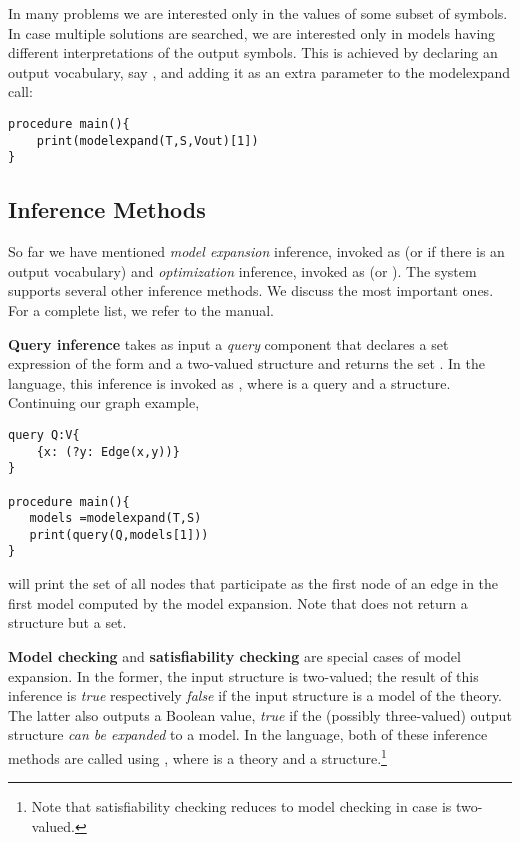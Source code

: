 In many problems we are interested only in the values of some subset of symbols. In case multiple solutions are searched, we are interested only in  models having different interpretations of the output symbols. This is achieved by declaring an output vocabulary, say , and adding it as an extra parameter to the  modelexpand call: 
\begin{lstlisting}
procedure main(){
    print(modelexpand(T,S,Vout)[1])
}
\end{lstlisting}

\subsection{Inference Methods}

So far we have mentioned \emph{model expansion} inference, invoked as
 (or  if there is an output vocabulary) and \emph{optimization} inference, invoked as
 (or ). The system supports several other inference
methods. We discuss the most important ones. For a complete list,
we refer to the manual. 

\textbf{Query inference} takes as input a \emph{query} component that declares a
set expression of the form  and a two-valued structure
\struct and returns the set . In the \idp language, this inference is invoked as , where  is a query and   a structure. 
Continuing our
graph example,

\begin{lstlisting}
query Q:V{
    {x: (?y: Edge(x,y))}
}

procedure main(){
   models =modelexpand(T,S) 
   print(query(Q,models[1]))
}  
\end{lstlisting}
will print the set of all nodes that participate as the first node of an
edge in the first model computed by the model expansion. Note that
 does not return a structure but a set.


\textbf{Model checking} and \textbf{satisfiability checking} are special
cases of model expansion.  In the former, the input structure is two-valued; the result of this inference is \emph{true} respectively \emph{false} if the input structure is a model of the theory. The latter also outputs a Boolean value, \emph{true} if the (possibly three-valued) output structure \emph{can be expanded} to a model. 
In the \idp language, both of these inference methods are called using , where  is a theory and  a structure.\footnote{Note that satisfiability checking reduces to model checking in case  is two-valued.}

